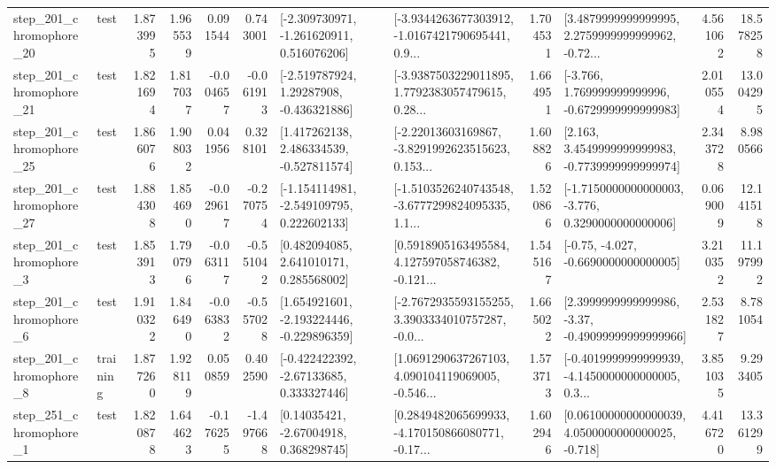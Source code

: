 \begin{tabular}{llrrrrllrlrr}
  step\_201\_chromophore\_20 &      test &      1.873995 &    1.965539 &      0.091544 &  0.743001 &   [-2.309730971, -1.261620911, 0.516076206] &  [-3.9344263677303912, -1.0167421790695441, 0.9... &       1.704531 &  [3.4879999999999995, 2.2759999999999962, -0.72... &            4.561062 &         18.578258 \\
  step\_201\_chromophore\_21 &      test &      1.821694 &    1.817037 &     -0.004657 & -0.061913 &    [-2.519787924, 1.29287908, -0.436321886] &  [-3.9387503229011895, 1.7792383057479615, 0.28... &       1.664951 &   [-3.766, 1.769999999999996, -0.6729999999999983] &            2.010554 &         13.004295 \\
  step\_201\_chromophore\_25 &      test &      1.866076 &    1.908032 &      0.041956 &  0.328101 &    [1.417262138, 2.486334539, -0.527811574] &  [-2.22013603169867, -3.8291992623515623, 0.153... &       1.608826 &   [2.163, 3.4549999999999983, -0.7739999999999974] &            2.343728 &          8.980566 \\
  step\_201\_chromophore\_27 &      test &      1.884308 &    1.854690 &     -0.029617 & -0.270754 &   [-1.154114981, -2.549109795, 0.222602133] &  [-1.5103526240743548, -3.6777299824095335, 1.1... &       1.520866 &  [-1.7150000000000003, -3.776, 0.3290000000000006] &            0.069009 &         12.141518 \\
   step\_201\_chromophore\_3 &      test &      1.853913 &    1.790796 &     -0.063117 & -0.551042 &     [0.482094085, 2.641010171, 0.285568002] &  [0.5918905163495584, 4.127597058746382, -0.121... &       1.545167 &               [-0.75, -4.027, -0.6690000000000005] &            3.210352 &         11.197992 \\
   step\_201\_chromophore\_6 &      test &      1.910322 &    1.846490 &     -0.063832 & -0.557028 &   [1.654921601, -2.193224446, -0.229896359] &  [-2.7672935593155255, 3.3903334010757287, -0.0... &       1.665022 &  [2.3999999999999986, -3.37, -0.49099999999999966] &            2.531827 &          8.781054 \\
   step\_201\_chromophore\_8 &  training &      1.877260 &    1.928119 &      0.050859 &  0.402590 &    [-0.422422392, -2.67133685, 0.333327446] &  [1.0691290637267103, 4.090104119069005, -0.546... &       1.573713 &  [-0.4019999999999939, -4.1450000000000005, 0.3... &            3.851035 &          9.293405 \\
   step\_251\_chromophore\_1 &      test &      1.820878 &    1.644623 &     -0.176255 & -1.497668 &      [0.14035421, -2.67004918, 0.368298745] &  [0.2849482065699933, -4.170150866080771, -0.17... &       1.602946 &  [0.06100000000000039, 4.0500000000000025, -0.718] &            4.416720 &         13.361299 \\

\end{tabular}
